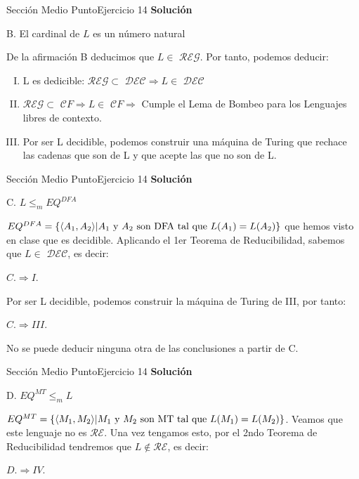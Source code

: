 \documentclass[10pt, envcountsect, presentation, aspectratio=169]{beamer}
\newcommand{\lreg}{\ensuremath{\mathcal {REG}}}
\newcommand{\lcf}{\ensuremath{\mathcal CF}}
\newcommand{\ld}{\ensuremath{\mathcal {DEC}}}
\newcommand{\lr}{\ensuremath{\mathcal {RE}}}
\begin{document}
\begin{frame}{Sección Medio Punto}{Ejercicio 14}
    \textbf{Solución}\\
     \begin{center}
        B. El cardinal de $L$ es un número natural
    \end{center}
    De la afirmación B deducimos que $L \in$ \lreg. Por tanto, podemos deducir:
    \begin{enumerate}[I.]
        \item L es dedicible: \lreg $\subset$ \ld $\Rightarrow L \in$ \ld
        \item \lreg $\subset$ \lcf $\Rightarrow L \in$ \lcf $\Rightarrow$ Cumple el Lema de Bombeo para los Lenguajes libres de contexto.
        \item Por ser L decidible, podemos construir una máquina de Turing que rechace las cadenas que son de L y que acepte las que no son de L.
    \end{enumerate}
\end{frame}

\begin{frame}{Sección Medio Punto}{Ejercicio 14}
    \textbf{Solución}\\
     \begin{center}
        C. $L \le_m  EQ^{DFA}$  
    \end{center}
    $EQ^{DFA} = \{\langle A_1, A_2\rangle \space | \space A_1 \text{ y } A_2 \text{ son DFA tal que } L(A_1) = L(A_2)\}$  que hemos visto en clase que es decidible.
    \vspace{3mm}
    Aplicando el 1er Teorema de Reducibilidad, sabemos que $L\in$ \ld, es decir: 
    \begin{center}
        $C. \Rightarrow I.$
    \end{center}
    Por ser L decidible, podemos construir la máquina de Turing de III, por tanto: 
    \begin{center}
        $C. \Rightarrow III.$
    \end{center}
    No se puede deducir ninguna otra de las conclusiones a partir de C.
     
\end{frame}

\begin{frame}{Sección Medio Punto}{Ejercicio 14}
    \textbf{Solución}\\
     \begin{center}
        D. $EQ^{MT} \le_m L$   
    \end{center}
    $EQ^{MT} = \{\langle M_1, M_2\rangle \space | \space M_1 \text{ y } M_2 \text{ son MT tal que } L(M_1) = L(M_2)\}$. Veamos que este lenguaje no es \lr. Una vez tengamos esto, por el 2ndo Teorema de Reducibilidad tendremos que $L\notin \lr$, es decir:
    \begin{center}
        $D. \Rightarrow IV.$
    \end{center}
\end{frame}
\end{document}
